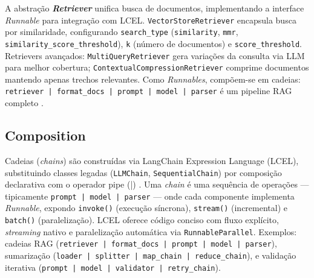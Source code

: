 \documentclass[12pt]{article}
\begin{document}
A abstração \textbf{\textit{Retriever}} unifica busca de documentos, implementando a interface \textit{Runnable} para integração com LCEL. \texttt{VectorStoreRetriever} encapsula busca por similaridade, configurando \texttt{search\_type} (\texttt{similarity}, \texttt{mmr}, \texttt{similarity\_score\_threshold}), \texttt{k} (número de documentos) e \texttt{score\_threshold}. Retrievers avançados: \texttt{MultiQueryRetriever} gera variações da consulta via LLM para melhor cobertura; \texttt{ContextualCompressionRetriever} comprime documentos mantendo apenas trechos relevantes. Como \textit{Runnables}, compõem-se em cadeias: \texttt{retriever | format\_docs | prompt | model | parser} é um pipeline RAG completo \cite{langchain2023docs}.

\subsection{Composition}
\label{subsec:composition}


Cadeias (\textit{chains}) são construídas via LangChain Expression Language (LCEL), substituindo classes legadas (\texttt{LLMChain}, \texttt{SequentialChain}) por composição declarativa com o operador pipe (|) \cite{langchain2023docs}. Uma \textit{chain} é uma sequência de operações — tipicamente \texttt{prompt | model | parser} — onde cada componente implementa \textit{Runnable}, expondo \texttt{invoke()} (execução síncrona), \texttt{stream()} (incremental) e \texttt{batch()} (paralelização). LCEL oferece código conciso com fluxo explícito, \textit{streaming} nativo e paralelização automática via \texttt{RunnableParallel}. Exemplos: cadeias RAG (\texttt{retriever | format\_docs | prompt | model | parser}), sumarização (\texttt{loader | splitter | map\_chain | reduce\_chain}), e validação iterativa (\texttt{prompt | model | validator | retry\_chain}).

\end{document}
